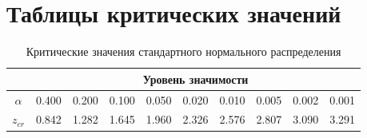 \documentclass[12pt]{article}
\begin{document}
\newpage

\section{Таблицы критических значений}

\begin{table}[h]
\caption{Критические значения стандартного нормального распределения}
{\small \begin{center}
\begin{tabular}{|c|c|c|c|c|c|c|c|c|c|}
  \hline
 & \multicolumn{9}{c|}{Уровень значимости } \\ \hline
$\alpha$ &  0.400 &  0.200 &  0.100 &  0.050 &  0.020 &  0.010 & 0.005 &0.002 & 0.001\\ \hline
$z_{cr}$ &  0.842 &  1.282 &  1.645 &  1.960 & 2.326& 2.576& 2.807& 3.090 & 3.291\\
  \hline
\end{tabular}
\end{center} }
\end{table}

\end{document}
